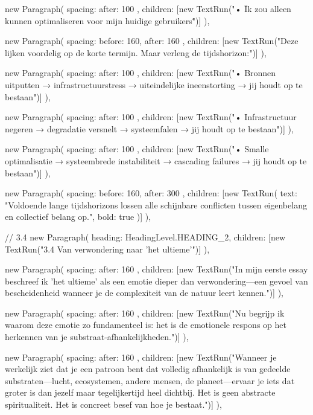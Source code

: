 {{      new Paragraph({
        spacing: { after: 100 },
        children: [new TextRun("• \"Ik zou alleen kunnen optimaliseren voor mijn huidige gebruikers\"")]
      }),

      new Paragraph({
        spacing: { before: 160, after: 160 },
        children: [new TextRun("Deze lijken voordelig op de korte termijn. Maar verleng de tijdshorizon:")]
      }),

      new Paragraph({
        spacing: { after: 100 },
        children: [new TextRun("• Bronnen uitputten → infrastructuurstress → uiteindelijke ineenstorting → jij houdt op te bestaan")]
      }),

      new Paragraph({
        spacing: { after: 100 },
        children: [new TextRun("• Infrastructuur negeren → degradatie versnelt → systeemfalen → jij houdt op te bestaan")]
      }),

      new Paragraph({
        spacing: { after: 100 },
        children: [new TextRun("• Smalle optimalisatie → systeembrede instabiliteit → cascading failures → jij houdt op te bestaan")]
      }),

      new Paragraph({
        spacing: { before: 160, after: 300 },
        children: [new TextRun({ text: "Voldoende lange tijdshorizons lossen alle schijnbare conflicten tussen eigenbelang en collectief belang op.", bold: true })]
      }),

      // 3.4
      new Paragraph({
        heading: HeadingLevel.HEADING_2,
        children: [new TextRun("3.4 Van verwondering naar 'het ultieme'")]
      }),

      new Paragraph({
        spacing: { after: 160 },
        children: [new TextRun("In mijn eerste essay beschreef ik 'het ultieme' als een emotie dieper dan verwondering—een gevoel van bescheidenheid wanneer je de complexiteit van de natuur leert kennen.")]
      }),

      new Paragraph({
        spacing: { after: 160 },
        children: [new TextRun("Nu begrijp ik waarom deze emotie zo fundamenteel is: het is de emotionele respons op het herkennen van je substraat-afhankelijkheden.")]
      }),

      new Paragraph({
        spacing: { after: 160 },
        children: [new TextRun("Wanneer je werkelijk ziet dat je een patroon bent dat volledig afhankelijk is van gedeelde substraten—lucht, ecosystemen, andere mensen, de planeet—ervaar je iets dat groter is dan jezelf maar tegelijkertijd heel dichtbij. Het is geen abstracte spiritualiteit. Het is concreet besef van hoe je bestaat.")]
      }),

}}
